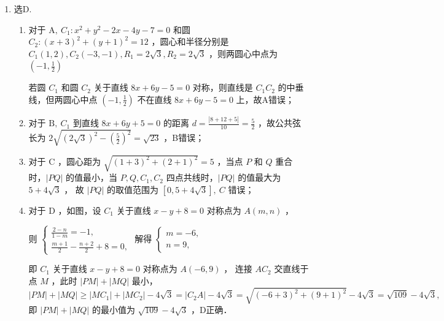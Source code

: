 \begin{tips}
\begin{enumerate}
              又因为点 $Q$ 在圆 $O$ 上，且 $|O P|=4 \sqrt{2}$ ，圆 $O$ 的圆心为 $O(0,0)$ ，半径 $r=2$，

              所以当 $O P \perp l$ ，且 $Q, ~ O, ~ P$ 三点共线时，点 $Q$ 到直线 $l$ 的距离 $d$ 最大，最大为 $4 \sqrt{2}+2$ ，此时 $k_{O P}=\frac{-4-0}{4-0}=-1$ ，所以直线 $l$ 的斜率为 1 ，即 $2+t=1+t$ ，无解，

              故直线 $l$ 不存在，所以 $d<4 \sqrt{2}+2$ ；

              当直线 $l$ 与圆 $O$ 相交或相切时，点 $Q$ 到直线 $l$ 的距离 $d$ 最小，最小为 0 ，

              故点 $Q$ 到直线 $l$ 的距离 $d$ 的取值范围为 $[0,4 \sqrt{2}+2)$ ．
        \item 选D.
              \begin{enumerate}
                  \item 对于 $\mathrm{A}, ~ C_1: x^2+y^2-2 x-4 y-7=0$ 和圆 $C_2:(x+3)^2+(y+1)^2=12$ ，圆心和半径分别是 $C_1(1,2), C_2(-3,-1), R_1=2 \sqrt{3}, R_2=2 \sqrt{3}$ ，则两圆心中点为 $\left(-1, \frac{1}{2}\right)$

                        若圆 $C_1$ 和圆 $C_2$ 关于直线 $8 x+6 y-5=0$ 对称，则直线是 $C_1 C_2$ 的中垂线，但两圆心中点 $\left(-1, \frac{1}{2}\right)$ 不在直线 $8 x+6 y-5=0$ 上，故A错误；

                  \item 对于 $\mathrm{B}, ~ C_1$ 到直线 $8 x+6 y+5=0$ 的距离 $d=\frac{|8+12+5|}{10}=\frac{5}{2}$ ，故公共弦长为 $2 \sqrt{(2 \sqrt{3})^2-\left(\frac{5}{2}\right)^2}=\sqrt{23}$ ，B错误；

                  \item 对于 C ，圆心距为 $\sqrt{(1+3)^2+(2+1)^2}=5$ ，当点 $P$ 和 $Q$ 重合时，$|P Q|$ 的值最小，当 $P, Q, C_1, C_2$ 四点共线时，$|P Q|$ 的值最大为 $5+4 \sqrt{3}$ ，
                        故 $|P Q|$ 的取值范围为 $[0,5+4 \sqrt{3}], ~ C$ 错误；

                  \item 对于 D ，如图，设 $C_1$ 关于直线 $x-y+8=0$ 对称点为 $A(m, n)$ ，

                        则 $\left\{\begin{array}{c}\frac{2-n}{1-m}=-1, \\ \frac{m+1}{2}-\frac{n+2}{2}+8=0,\end{array}\right.$ 解得 $\left\{\begin{array}{c}m=-6, \\ n=9,\end{array}\right.$

                        即 $C_1$ 关于直线 $x-y+8=0$ 对称点为 $A(-6,9)$ ，
                        连接 $A C_2$ 交直线于点 $M$ ，此时 $|P M|+|M Q|$ 最小，
                        $$
                            |P M|+|M Q| \geq\left|M C_1\right|+\left|M C_2\right|-4 \sqrt{3}=\left|C_2 A\right|-4 \sqrt{3}=\sqrt{(-6+3)^2+(9+1)^2}-4 \sqrt{3}=\sqrt{109}-4 \sqrt{3},
                        $$
                        即 $|P M|+|M Q|$ 的最小值为 $\sqrt{109}-4 \sqrt{3}$ ，D正确．
              \end{enumerate}
    \end{enumerate}
\end{tips}